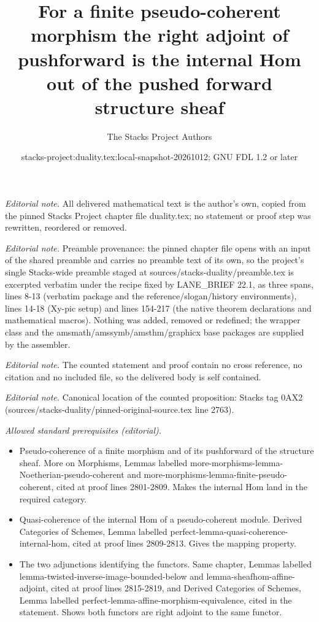 \documentclass[10pt,a4paper]{amsart}
\title{For a finite pseudo-coherent morphism the right adjoint of pushforward is the internal Hom out of the pushed forward structure sheaf}
\author{The Stacks Project Authors}
\date{stacks-project:duality.tex:local-snapshot-20261012; GNU FDL 1.2 or later}
\theoremstyle{plain}
\theoremstyle{definition}
\theoremstyle{remark}
\numberwithin{equation}{subsection}
\begin{document}
\maketitle
\noindent\textit{Editorial note.} All delivered mathematical text is the author's own, copied from the pinned Stacks Project chapter file duality.tex; no statement or proof step was rewritten, reordered or removed.\par\medskip
\noindent\textit{Editorial note.} Preamble provenance: the pinned chapter file opens with an input of the shared preamble and carries no preamble text of its own, so the project's single Stacks-wide preamble staged at sources/stacks-duality/preamble.tex is excerpted verbatim under the recipe fixed by LANE\_BRIEF 22.1, as three spans, lines 8-13 (verbatim package and the reference/slogan/history environments), lines 14-18 (Xy-pic setup) and lines 154-217 (the native theorem declarations and mathematical macros). Nothing was added, removed or redefined; the wrapper class and the amsmath/amssymb/amsthm/graphicx base packages are supplied by the assembler.\par\medskip
\noindent\textit{Editorial note.} The counted statement and proof contain no cross reference, no citation and no included file, so the delivered body is self contained.\par\medskip
\noindent\textit{Editorial note.} Canonical location of the counted proposition: Stacks tag 0AX2 (sources/stacks-duality/pinned-original-source.tex line 2763).\par\medskip
\noindent\textit{Allowed standard prerequisites (editorial).}\begin{itemize}
\item Pseudo-coherence of a finite morphism and of its pushforward of the structure sheaf. More on Morphisms, Lemmas labelled more-morphisms-lemma-Noetherian-pseudo-coherent and more-morphisms-lemma-finite-pseudo-coherent, cited at proof lines 2801-2809. Makes the internal Hom land in the required category.
\item Quasi-coherence of the internal Hom of a pseudo-coherent module. Derived Categories of Schemes, Lemma labelled perfect-lemma-quasi-coherence-internal-hom, cited at proof lines 2809-2813. Gives the mapping property.
\item The two adjunctions identifying the functors. Same chapter, Lemmas labelled lemma-twisted-inverse-image-bounded-below and lemma-sheafhom-affine-adjoint, cited at proof lines 2815-2819, and Derived Categories of Schemes, Lemma labelled perfect-lemma-affine-morphism-equivalence, cited in the statement. Shows both functors are right adjoint to the same functor.
\end{itemize}\medskip
\end{document}
